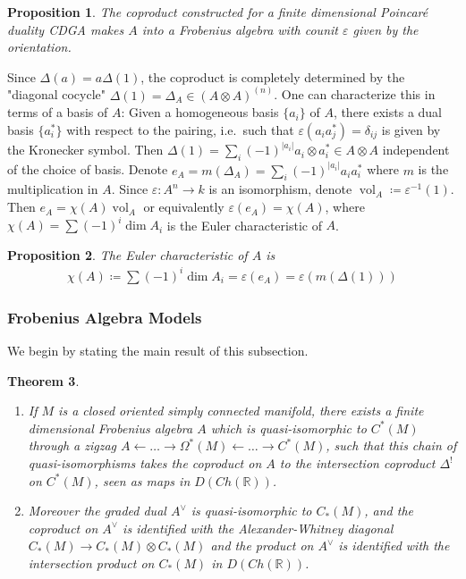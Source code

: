 \documentclass{scrartcl}
\theoremstyle{plain}
\newtheorem{theorem}{Theorem}[section]
\newtheorem{proposition}[theorem]{Proposition}
\theoremstyle{definition}
\newcommand{\R}{\mathbb R}
\renewcommand{\epsilon}{\varepsilon}
\newcommand{\abs}[1]{\left\lvert#1\right\rvert}
\DeclareMathOperator{\vol}{vol}
\newcommand{\defeq}{\coloneqq}
\newcommand{\from}{\leftarrow}
\begin{document}
\begin{proposition}
    The coproduct constructed for a finite dimensional Poincaré duality CDGA makes $A$ into a Frobenius algebra with counit $\epsilon$ given by the orientation.
\end{proposition}

Since $\Delta(a) = a\Delta(1)$, the coproduct is completely determined by the "diagonal cocycle" $\Delta(1)=\Delta_A\in (A\otimes A)^{(n)}$. One can characterize this in terms of a basis of $A$: Given a homogeneous basis $\{a_i\}$ of $A$, there  exists a dual basis $\{a_i^*\}$ with respect to the pairing, i.e.\ such that $\epsilon(a_i a_j^*) = \delta_{ij}$ is given by the Kronecker symbol. Then $\Delta(1) = \sum_i (-1)^{\abs{a_i}} a_i \otimes a_i^*\in A\otimes A$ independent of the choice of basis. Denote $e_A = m(\Delta_A) = \sum_i (-1)^{\abs{a_i}} a_i a_i^*$ where $m$ is the multiplication in $A$. Since $\epsilon\colon A^n\to k$ is an isomorphism, denote $\vol_A\defeq \epsilon^{-1}(1)$. Then $e_A = \chi(A) \vol_A$ or equivalently $\epsilon(e_A) = \chi(A)$, where $\chi(A) = \sum (-1)^i\dim A_i$ is the Euler characteristic of $A$. 

\begin{proposition}
    The Euler characteristic of $A$ is
    \begin{align*}
        \chi(A) \defeq \sum (-1)^i\dim A_i = \epsilon(e_A) = \epsilon(m(\Delta(1)))
    \end{align*}
\end{proposition}

\subsubsection{Frobenius Algebra Models}\label{subsubsec:frobenius-algebra-models}

We begin by stating the main result of this subsection. 
\begin{theorem}\label{thm:frobenius-model}
    \begin{enumerate}
    \item If $M$ is a closed oriented simply connected manifold, there exists a finite dimensional Frobenius algebra $A$ which is quasi-isomorphic to $C^*(M)$ through a zigzag $A\from \dots\to \Omega^*(M)\from\dots\to C^*(M)$, such that this chain of quasi-isomorphisms takes the coproduct on $A$ to the intersection coproduct $\Delta^!$ on $C^*(M)$, seen as maps in $D(Ch(\R))$. 
    
    \item Moreover the graded dual $A^\vee$ is quasi-isomorphic to $C_*(M)$, and the coproduct on $A^\vee$ is identified with the Alexander-Whitney diagonal $C_*(M)\to C_*(M)\otimes C_*(M)$ and the product on $A^\vee$ is identified with the intersection product on $C_*(M)$ in $D(Ch(\R))$.
    \end{enumerate}
\end{theorem}
\end{document}

